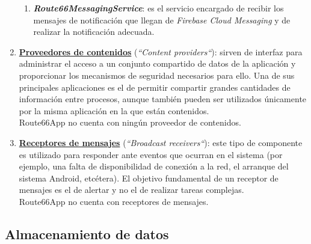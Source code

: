 \documentclass[twoside]{report}
\begin{document}
\begin{enumerate}
\begin{enumerate}
	\item \textbf{\textit{Route66MessagingService}}: es el servicio encargado de recibir los mensajes de notificación que llegan de \textit{Firebase Cloud Messaging} y de realizar la notificación adecuada.
	\end{enumerate}

\item \textbf{\underline{Proveedores de contenidos}} (\textit{“Content providers“}): sirven de interfaz para administrar el acceso a un conjunto compartido de datos de la aplicación y proporcionar los mecanismos de seguridad necesarios para ello. Una de sus principales aplicaciones es el de permitir compartir grandes cantidades de información entre procesos, aunque también pueden ser utilizados únicamente por la misma aplicación en la que están contenidos.\\
Route66App no cuenta con ningún proveedor de contenidos.

\item \textbf{\underline{Receptores de mensajes}} (\textit{“Broadcast receivers“}): este tipo de componente es utilizado para responder ante eventos que ocurran en el sistema (por ejemplo, una falta de disponibilidad de conexión a la red, el arranque del sistema Android, etcétera). El objetivo fundamental de un receptor de mensajes es el de alertar y no el de realizar tareas complejas. \\
Route66App no cuenta con receptores de mensajes.
\end{enumerate}

\subsection{Almacenamiento de datos}
\end{document}
